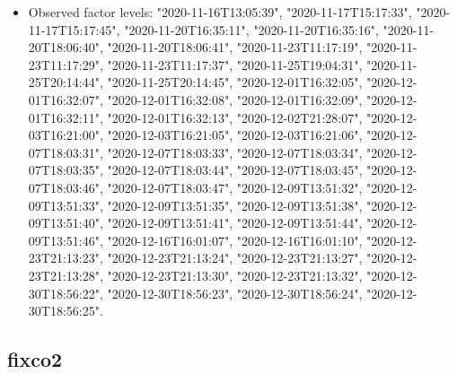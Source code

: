 \documentclass[]{article}
\providecommand{\tightlist}{%
  \setlength{\itemsep}{0pt}\setlength{\parskip}{0pt}}
\begin{document}
\begin{itemize}
\tightlist
\item
  Observed factor levels: "2020-11-16T13:05:39", "2020-11-17T15:17:33",
  "2020-11-17T15:17:45", "2020-11-20T16:35:11", "2020-11-20T16:35:16",
  "2020-11-20T18:06:40", "2020-11-20T18:06:41", "2020-11-23T11:17:19",
  "2020-11-23T11:17:29", "2020-11-23T11:17:37", "2020-11-25T19:04:31",
  "2020-11-25T20:14:44", "2020-11-25T20:14:45", "2020-12-01T16:32:05",
  "2020-12-01T16:32:07", "2020-12-01T16:32:08", "2020-12-01T16:32:09",
  "2020-12-01T16:32:11", "2020-12-01T16:32:13", "2020-12-02T21:28:07",
  "2020-12-03T16:21:00", "2020-12-03T16:21:05", "2020-12-03T16:21:06",
  "2020-12-07T18:03:31", "2020-12-07T18:03:33", "2020-12-07T18:03:34",
  "2020-12-07T18:03:35", "2020-12-07T18:03:44", "2020-12-07T18:03:45",
  "2020-12-07T18:03:46", "2020-12-07T18:03:47", "2020-12-09T13:51:32",
  "2020-12-09T13:51:33", "2020-12-09T13:51:35", "2020-12-09T13:51:38",
  "2020-12-09T13:51:40", "2020-12-09T13:51:41", "2020-12-09T13:51:44",
  "2020-12-09T13:51:46", "2020-12-16T16:01:07", "2020-12-16T16:01:10",
  "2020-12-23T21:13:23", "2020-12-23T21:13:24", "2020-12-23T21:13:27",
  "2020-12-23T21:13:28", "2020-12-23T21:13:30", "2020-12-23T21:13:32",
  "2020-12-30T18:56:22", "2020-12-30T18:56:23", "2020-12-30T18:56:24",
  "2020-12-30T18:56:25".
\end{itemize}

\noindent\makebox[\linewidth]{\rule{\textwidth}{0.4pt}}

\hypertarget{fixco2}{%
\subsection{fixco2}\label{fixco2}}
\end{document}

